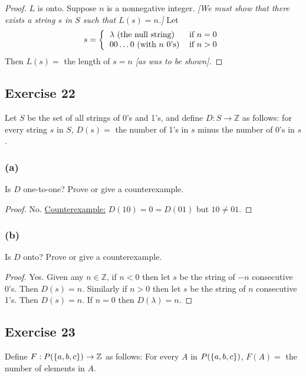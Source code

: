 \documentclass[14pt]{extarticle}
\let\mathscr\relax
\newcommand{\ps}{\mathscr{P}} %
\newcommand{\Z}{\mathbb{Z}}
\begin{document}
\begin{proof}
    $L$ is onto. Suppose $n$ is a nonnegative integer. {\it [We must show that there exists a string $s$ in $S$ such that
                \(L(s) = n\).]} Let
    \[
        s =
        \left\{
        \begin{tabular}{lr}
            \(\lambda\) (the null string) & if \(n = 0\) \\
            \(00\ldots0\) (with $n$ 0's)  & if \(n > 0\)
        \end{tabular}
        \right.
    \]
    Then \(L(s) =\) the length of $s = n$ {\it [as was to be shown].}
\end{proof}

\subsection{Exercise 22}
Let $S$ be the set of all strings of 0’s and 1’s, and define \(D: S \to \Z\) as follows: for every string $s$ in
$S$, \(D(s) =\) the number of 1's in $s$ minus the number of 0's in $s$.

\subsubsection{(a)}
Is $D$ one-to-one? Prove or give a counterexample.

\begin{proof}
    No. \underline{Counterexample:} \(D(10) = 0 = D(01)\) but \(10 \neq 01\).
\end{proof}

\subsubsection{(b)}
Is $D$ onto? Prove or give a counterexample.

\begin{proof}
    Yes. Given any $n \in \Z$, if $n < 0$ then let $s$ be the string of $-n$ consecutive 0's. Then $D(s) = n$.
    Similarly if $n > 0$ then let $s$ be the string of $n$ consecutive 1's. Then $D(s) = n$.
    If $n = 0$ then $D(\lambda) = n$.
\end{proof}

\subsection{Exercise 23}
Define \(F: \ps(\{a, b, c\}) \to \Z\) as follows: For every
$A$ in \(\ps(\{a, b, c\})\), \(F(A) =\) the number of
elements in $A$.
\end{document}
